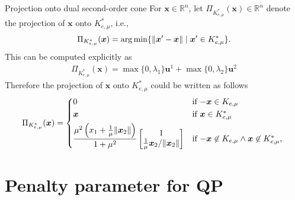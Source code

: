 \documentclass[8pt,red]{beamer}
\theoremstyle{plain}
\theoremstyle{definition}
\theoremstyle{remark}
\newcommand{\argmin}{\operatornamewithlimits{\mathrm{arg\,min}}}
\renewcommand{\Re}{\ensuremath{\mathbb{R}}}
\newcommand{\bi}[1]{\ensuremath{\boldsymbol{#1}}}
\begin{document}
\begin{frame}{Projection onto dual second-order cone}
For $\bi{x} \in \Re^{n}$, let $\Pi_{K_{e,\mu}^{*}}(\bi{x}) \in \Re^{n}$ 
denote the projection of $\bi{x}$ onto $K_{e,\mu}^{*}$, i.e., 
\begin{align}
  \Pi_{K_{e,\mu}^{*}}(\bi{x}) 
  = \argmin \{  \| \bi{x}' - \bi{x} \| 
  \mid \bi{x}' \in K_{e,\mu}^{*} \} . 
\end{align}
This can be computed explicitly as \citep{fukushima2002smoothing}
\begin{align}
  \Pi_{K_{e,\mu}^{*}}(\bi{x}) 
  = \max \{ 0,\lambda_{1} \} \bi{u}^{1} 
  + \max \{ 0,\lambda_{2} \} \bi{u}^{2} 
  \label{eq.projection.formula}
\end{align}
Therefore the projection of $\bi{x}$ onto $K_{e,\mu}^{*}$ could be written as follows
\begin{align}
  \Pi_{K_{e,\mu}^{*}}(\bi{x}) = 
  \begin{dcases*}
	0
    & if $-\bi{x} \in K_{e,\mu}$ \\
    \bi{x}
    & if $\bi{x} \in K_{e,\mu}^{*}$ \\
    \frac{\mu^{2} \left(x_{1} + \frac{1}{\mu} \| \bi{x}_{2} \|\right)}{1+\mu^{2}} 
    \begin{bmatrix}
      1 \\    \frac{1}{\mu} \bi{x}_{2} / \| \bi{x}_{2} \| 
    \end{bmatrix}
    & if $-\bi{x} \not\in K_{e,\mu} \wedge \bi{x} \not\in K_{e,\mu}^{*}$, \\
  \end{dcases*}  
\end{align}
\end{frame}

\section{Penalty parameter for QP}
\end{document}
